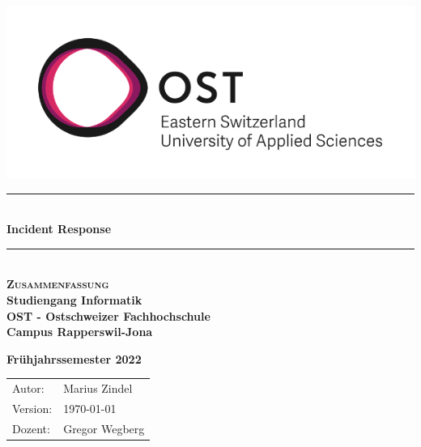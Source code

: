 


\begin{titlepage}


   \newcommand{\HRule}{\color{black}\rule{\linewidth}{0.5mm}} %
   
   \center
   
   \begin{minipage}{0.49\linewidth}
         \vspace{2pt}
        \hfill
   \end{minipage}
   \begin{minipage}{0.49\linewidth}
      \hfill
      \includegraphics[width=0.6\linewidth]{img/OST_Logo}
   \end{minipage}

   \vspace*{\fill}

   \vspace{1.5cm}

   {\HRule} \\[0.7cm]
   {\huge \bfseries Incident Response}\\[0.4cm]
   
   {\HRule} \\[1.5cm]
   
   \textbf{\textsc{\Huge Zusammenfassung}}\\[1.5cm]
   
   \Large
   \textbf{Studiengang Informatik}\\
   \textbf{OST - Ostschweizer Fachhochschule}\\
   \textbf{Campus Rapperswil-Jona}\\
   
   \vspace{1cm}
   
   \textbf{Frühjahrssemester 2022}\\
   
   \vspace{1.5cm}

   \begin{center}
      \begin{tabular} {|p{3cm} p{4cm}|}
         Autor:          &     Marius Zindel     \\
         Version:          &     \today         \\
         Dozent:         &     Gregor Wegberg    \\
      \end{tabular}
   \end{center}



   \vfill %

\end{titlepage}


\setcounter{tocdepth}{1}


